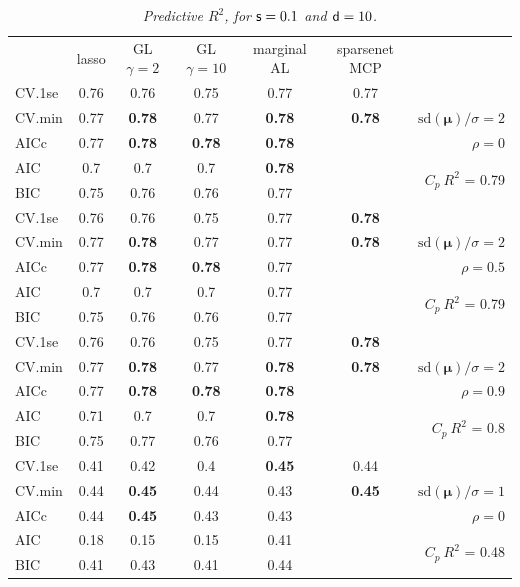 \documentclass[12pt]{article}
\newcommand{\mr}[1]{\mathrm{#1}}
\newcommand{\bm}[1]{\mathbf{#1}}
\begin{document}
\begin{table}[p]\vspace{-.5cm}
\caption[l]{\it Predictive $R^2$, for ${\sf s}=0.1$ and  ${\sf d}=10$.}
\vspace{-.5cm}
\small{}
\begin{center}
\begin{tabular}{l*{5}{c}|r}
 & lasso & GL $\gamma=2$ & GL $\gamma=10$ & marginal AL & sparsenet MCP  &  \\
\cline{1-7}
CV.1se & 0.76 & 0.76 & 0.75 & 0.77 & 0.77 &\\
CV.min & 0.77 & {\bf 0.78} & 0.77 & {\bf 0.78} & {\bf 0.78} &  $\mr{sd}(\bm{\mu})/\sigma=2$ \\
AICc & 0.77 & {\bf 0.78} & {\bf 0.78} & {\bf 0.78} & & $\rho=0$ \\
AIC & 0.7 & 0.7 & 0.7 & {\bf 0.78} & & \multirow{2}{*}{$C_p ~ R^2$ = 0.79} \\
BIC & 0.75 & 0.76 & 0.76 & 0.77 & & \\
 \hline 
CV.1se & 0.76 & 0.76 & 0.75 & 0.77 & {\bf 0.78} &\\
CV.min & 0.77 & {\bf 0.78} & 0.77 & 0.77 & {\bf 0.78} &  $\mr{sd}(\bm{\mu})/\sigma=2$ \\
AICc & 0.77 & {\bf 0.78} & {\bf 0.78} & 0.77 & & $\rho=0.5$ \\
AIC & 0.7 & 0.7 & 0.7 & 0.77 & & \multirow{2}{*}{$C_p ~ R^2$ = 0.79} \\
BIC & 0.75 & 0.76 & 0.76 & 0.77 & & \\
 \hline 
CV.1se & 0.76 & 0.76 & 0.75 & 0.77 & {\bf 0.78} &\\
CV.min & 0.77 & {\bf 0.78} & 0.77 & {\bf 0.78} & {\bf 0.78} &  $\mr{sd}(\bm{\mu})/\sigma=2$ \\
AICc & 0.77 & {\bf 0.78} & {\bf 0.78} & {\bf 0.78} & & $\rho=0.9$ \\
AIC & 0.71 & 0.7 & 0.7 & {\bf 0.78} & & \multirow{2}{*}{$C_p ~ R^2$ = 0.8} \\
BIC & 0.75 & 0.77 & 0.76 & 0.77 & & \\
 \hline 
CV.1se & 0.41 & 0.42 & 0.4 & {\bf 0.45} & 0.44 &\\
CV.min & 0.44 & {\bf 0.45} & 0.44 & 0.43 & {\bf 0.45} &  $\mr{sd}(\bm{\mu})/\sigma=1$ \\
AICc & 0.44 & {\bf 0.45} & 0.43 & 0.43 & & $\rho=0$ \\
AIC & 0.18 & 0.15 & 0.15 & 0.41 & & \multirow{2}{*}{$C_p ~ R^2$ = 0.48} \\
BIC & 0.41 & 0.43 & 0.41 & 0.44 & & \\

\end{tabular}
\end{center}
\end{table}
\end{document}
